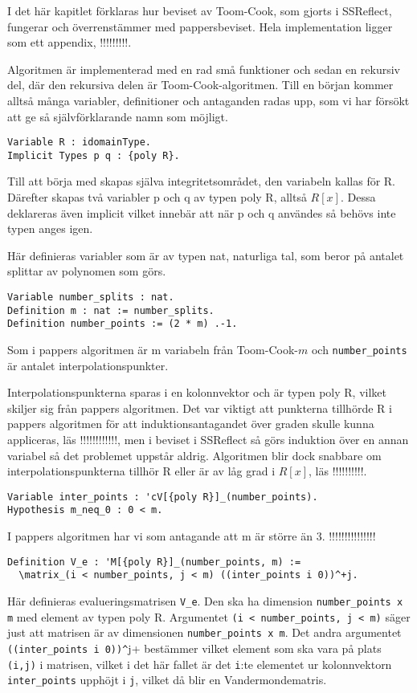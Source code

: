 I det här kapitlet förklaras hur beviset av Toom-Cook, som gjorts i SSReflect,
fungerar och överrenstämmer med pappersbeviset. Hela implementation ligger som
ett appendix, !!!!!!!!!.

Algoritmen är implementerad med en rad små funktioner och sedan en rekursiv
del, där den rekursiva delen är Toom-Cook-algoritmen. Till en början kommer
alltså många variabler, definitioner och antaganden radas upp, som vi har
försökt att ge så självförklarande namn som möjligt.
\begin{verbatim}
Variable R : idomainType.
Implicit Types p q : {poly R}.
\end{verbatim}
Till att börja med skapas själva integritetsområdet, den variabeln kallas för
R. Därefter skapas två variabler p och q av typen poly R, alltså $R[x]$. Dessa
deklareras även implicit vilket innebär att när p och q användes så behövs inte
typen anges igen.

Här definieras variabler som är av typen nat, naturliga tal, som beror på
antalet splittar av polynomen som görs.
\begin{verbatim}
Variable number_splits : nat.
Definition m : nat := number_splits.
Definition number_points := (2 * m) .-1.
\end{verbatim}
Som i pappers algoritmen är m variabeln från Toom-Cook-$m$ och
\verb+number_points+ är antalet interpolationspunkter.

Interpolationspunkterna sparas i en kolonnvektor och är typen poly R, vilket
skiljer sig från pappers algoritmen. Det var viktigt att punkterna tillhörde R
i pappers algoritmen för att induktionsantagandet över graden skulle kunna
appliceras, läs !!!!!!!!!!!!, men i beviset i SSReflect så görs induktion över
en annan variabel så det problemet uppstår aldrig. Algoritmen blir dock
snabbare om interpolationspunkterna tillhör R eller är av låg grad i $R[x]$,
läs !!!!!!!!!!.

\begin{verbatim}
Variable inter_points : 'cV[{poly R}]_(number_points).
Hypothesis m_neq_0 : 0 < m.
\end{verbatim}
I pappers algoritmen har vi som antagande att m är större än 3. !!!!!!!!!!!!!!!
\begin{verbatim}
Definition V_e : 'M[{poly R}]_(number_points, m) :=
  \matrix_(i < number_points, j < m) ((inter_points i 0))^+j.
\end{verbatim}
Här definieras evalueringsmatrisen \verb+V_e+. Den ska ha dimension
\verb+number_points x m+ med element av typen poly R. Argumentet
\verb+(i < number_points, j < m)+ säger just att matrisen är av dimensionen
\verb+number_points x m+. Det andra argumentet \verb+((inter_points i 0))^+j+
bestämmer vilket element som ska vara på plats \verb+(i,j)+ i matrisen, vilket
i det här fallet är det \verb+i+:te elementet ur kolonnvektorn
\verb+inter_points+ upphöjt i \verb+j+, vilket då blir en Vandermondematris.

